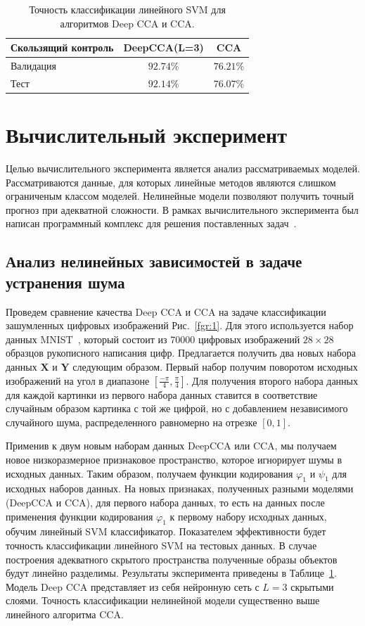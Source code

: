 \documentclass[12pt]{article}
\newcommand{\bY}{\mathbf{Y}}
\newcommand{\bX}{\mathbf{X}}
\begin{document}
	\begin{table}[h!]
		\caption{Точность классификации линейного SVM для алгоритмов Deep CCA и CCA.}
		\centering
		\begin{tabular}{l|cc}
			\hline
			Скользящий контроль & DeepCCA(L=3) & CCA \\  \hline
			Валидация & $92.74\%$  &  $76.21\%$\\
			Тест & $92.14\%$ & $76.07\%$ \\
			\hline
		\end{tabular}
		\label{tbl:1}
	\end{table}
	
	\section{Вычислительный эксперимент}
	Целью вычислительного эксперимента является анализ рассматриваемых моделей.
	Рассматриваются данные, для которых линейные методов являются слишком ограниченым классом моделей.
	Нелинейные модели позволяют получить точный прогноз при адекватной сложности.
	В рамках вычислительного эксперимента был написан программный комплекс для решения поставленных задач~\cite{source_code}.
	
	\subsection{Анализ нелинейных зависимостей в задаче устранения шума}
	
	Проведем сравнение качества Deep CCA и CCA на задаче классификации зашумленных цифровых изображений Рис.~\ref{fgr:1}. Для этого используется набор данных MNIST~\cite{MNIST}, который состоит из 70000 цифровых изображений $28 \times 28$ образцов рукописного написания цифр. Предлагается получить два новых набора данных $\bX$ и $\bY$ следующим образом. Первый набор получим поворотом исходных изображений на угол в диапазоне $[\frac{-\pi}{4}, \frac{\pi}{4}]$. Для получения второго набора данных для каждой картинки из первого набора данных ставится в соответствие случайным образом картинка с той же цифрой, но с добавлением независимого случайного шума, распределенного равномерно на отрезке $[0,1]$.
	
	Применив к двум новым наборам данных DeepCCA или CCA, мы получаем новое низкоразмерное признаковое пространство, которое игнорирует шумы в исходных данных. Таким образом, получаем функции кодирования $\varphi_1$ и $\psi_1$ для исходных наборов данных. На новых признаках, полученных разными моделями (DeepCCA и CCA), для первого набора данных, то есть на данных после применения функции кодирования $\varphi_1$ к первому набору исходных данных, обучим линейный SVM классификатор. Показателем эффективности будет точность классификации линейного SVM на тестовых данных. В случае построения адекватного скрытого пространства полученные образы объектов будут линейно разделимы. Результаты эксперимента приведены в Таблице~\ref{tbl:1}. Модель Deep CCA представляет из себя нейронную сеть с $L=3$ скрытыми слоями. Точность классификации нелинейной модели существенно выше линейного алгоритма CCA.
	
\end{document}
